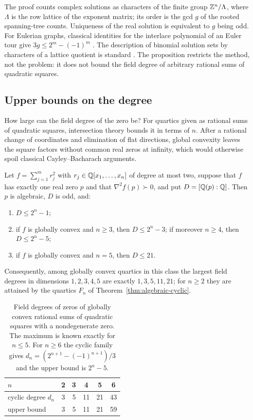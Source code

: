 The proof counts complex solutions as characters of the finite group
$\mathbb Z^n/\Lambda$, where $\Lambda$ is the row lattice of the exponent matrix;
its order is the gcd $g$ of the rooted spanning-tree counts. Uniqueness of the
real solution is equivalent to $g$ being odd. For Eulerian graphs, classical
identities for the interlace polynomial of an Euler tour give
$3g\le2^m-(-1)^m$ \cite{ArratiaBollobasSorkin2004,BalisterBollobasCutlerPebody2002}.
The description of binomial solution sets by characters of a lattice quotient
is standard \cite{EisenbudSturmfels1996}. The proposition restricts the method,
not the problem: it does not bound the field degree of arbitrary rational sums
of quadratic squares.

\subsection{Upper bounds on the degree}
\label{sec:algebraic-bounds}

How large can the field degree of the zero be? For quartics given as rational
sums of quadratic squares, intersection theory bounds it in terms of $n$. After
a rational change of coordinates and elimination of flat directions, global
convexity leaves the square factors
without common real zeros at infinity, which would otherwise spoil classical
Cayley--Bacharach arguments.

\begin{theorem}
\label{thm:algebraic-degree-bounds}
Let $f=\sum_{j=1}^mr_j^2$ with $r_j\in\mathbb Q[x_1,\ldots,x_n]$ of degree at most
two, suppose that $f$ has exactly one real zero $p$ and that
$\nabla^2f(p)\succ0$, and put $D=[\mathbb Q(p):\mathbb Q]$. Then $p$ is algebraic, $D$ is
odd, and:
\begin{enumerate}[label=(\alph*)]
\item $D\le2^n-1$;
\item if $f$ is globally convex and $n\ge3$, then $D\le2^n-3$; if moreover
  $n\ge4$, then $D\le2^n-5$;
\item if $f$ is globally convex and $n=5$, then $D\le21$.
\end{enumerate}
Consequently, among globally convex quartics in this class the largest field
degrees in dimensions $1,2,3,4,5$ are exactly $1,3,5,11,21$; for $n\ge2$ they
are attained by the quartics $F_n$ of Theorem~\ref{thm:algebraic-cyclic}.
\end{theorem}

\begin{table}[ht]
\centering
\begin{tabular}{@{}lccccc@{}}
\toprule
$n$ & 2 & 3 & 4 & 5 & 6\\
\midrule
cyclic degree $d_n$ & 3 & 5 & 11 & 21 & 43\\
upper bound & 3 & 5 & 11 & 21 & 59\\
\bottomrule
\end{tabular}
\caption{Field degrees of zeros of globally convex rational sums of quadratic
squares with a nondegenerate zero. The maximum is known exactly for $n\le5$.
For $n\ge6$ the cyclic family gives $d_n=(2^{n+1}-(-1)^{n+1})/3$ and the upper
bound is $2^n-5$.}
\label{tab:algebraic-degrees}
\end{table}


